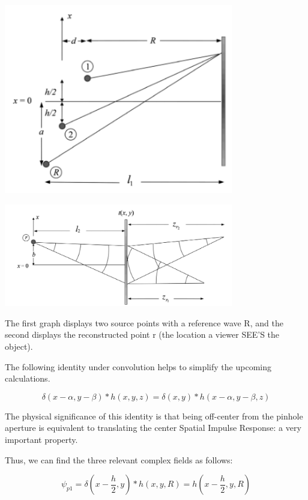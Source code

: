 \documentclass[12pt]{article}
\begin{document}
\begin{center}
\includegraphics[width=100mm]{tupac11.png}
\end{center}

\begin{center}
\includegraphics[width=100mm]{tupac12.png}
\end{center}

The first graph displays two source points with a reference wave R, and the second displays the reconstructed point r (the location a viewer SEE'S the object).

The following identity under convolution helps to simplify the upcoming calculations.

\begin{equation}
	\delta(x - \alpha,y - \beta)*h(x,y,z) = \delta(x,y)*h(x - \alpha,y - \beta,z)
\end{equation}

The physical significance of this identity is that being off-center from the pinhole
aperture is equivalent to translating the center Spatial Impulse Response: a very important property.

Thus, we can find the three relevant complex fields as follows:

\begin{equation}
	\psi_{p1} = \delta(x - \frac{h}{2},y)*h(x,y,R) = h(x - \frac{h}{2},y,R)
\end{equation}
\end{document}
